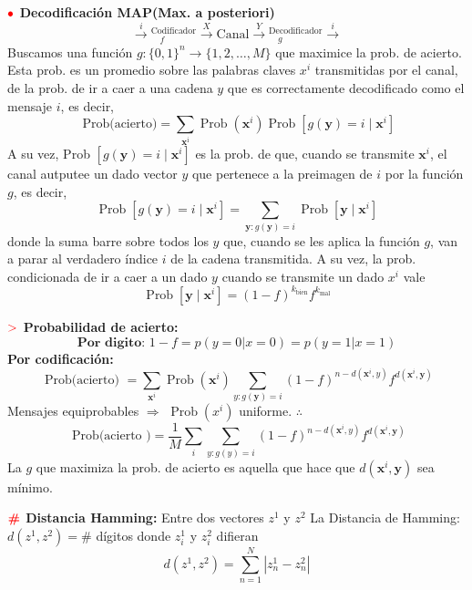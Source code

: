 \documentclass[%
 reprint,
 amsmath,amssymb,
 aps,
]{revtex4-1}
\begin{document}
\textbf{$\color{red}{\bullet}$ Decodificación MAP(Max. a posteriori)}
$$
\stackrel{i}{\rightarrow}
\boxed{^\text{Codificador}_{\quad f}} \stackrel{X}{\rightarrow}
\boxed{\text{Canal}} \stackrel{Y}{\rightarrow}
\boxed{^\text{Decodificador} _{\quad g}} \stackrel{i}{\rightarrow}$$
Buscamos una función $g:\{0,1\}^{n} \rightarrow\{1,2, \ldots, M\}$ que maximice la prob. de acierto. Esta prob. es un promedio sobre las palabras claves $x^{i}$ transmitidas por el canal, de la prob. de ir a caer a una cadena $y$ que es correctamente decodificado
como el mensaje $i$, es decir,
$$
\text { Prob(acierto})=\sum_{\boldsymbol{x}^{\mathrm{i}}} \operatorname{Prob}\left(\boldsymbol{x}^{i}\right) \operatorname{Prob}\left[g(\boldsymbol{y})=i \mid \boldsymbol{x}^{i}\right]
$$
A su vez, Prob $\left[g(\boldsymbol{y})=i \mid \boldsymbol{x}^{i}\right]$ es la prob. de que, cuando se transmite $\boldsymbol{x}^{i}$, el canal autputee un dado vector $y$ que pertenece a la preimagen de $i$ por la función $g$, es decir,
$$
\operatorname{Prob}\left[g(\boldsymbol{y})=i \mid \boldsymbol{x}^{i}\right]=\sum_{\boldsymbol{y} : g(\boldsymbol{y})=i} \operatorname{Prob}\left[\boldsymbol{y} \mid \boldsymbol{x}^{i}\right]
$$
donde la suma barre sobre todos los $y$ que, cuando se les aplica la función $g$, van a parar al verdadero índice $i$ de la cadena transmitida. A su vez, la prob. condicionada de ir a caer a un dado $y$ cuando se transmite un dado $x^{i}$ vale
$$
\operatorname{Prob}\left[\boldsymbol{y} \mid \boldsymbol{x}^{i}\right]=(1-f)^{k_{\text {bien}}} f^{k_{\operatorname{mal}}}
$$

\textbf{$\textcolor{red}{\mathbf{>}}$ Probabilidad de acierto:}
$$\textbf{Por digito: }1-f = p(y=0|x=0)=p(y=1|x=1)$$
\textbf{Por codificación:}
$$
\text { Prob(acierto) }=\sum_{\boldsymbol{x}^{i}} \operatorname{Prob}\left(\boldsymbol{x}^{i}\right) \sum_{y : g(\boldsymbol{y})=i}(1-f)^{n-d\left(\boldsymbol{x}^{i}, y\right)} f^{d\left(\boldsymbol{x}^{i}, \boldsymbol{y}\right)}
$$
Mensajes equiprobables $\Rightarrow$ $\operatorname{Prob}\left(x^{i}\right)$ uniforme. $\boldsymbol{\therefore}$
$$
\text { Prob(acierto })=\frac{1}{M} \sum_{i} \sum_{y : g(y)=i}(1-f)^{n-d\left(\boldsymbol{x}^{i}, y\right)} f^{d\left(\boldsymbol{x}^{i}, \boldsymbol{y}\right)}
$$
La $g$ que maximiza la prob. de acierto es aquella que hace que 
$d\left(\boldsymbol{x}^{i}, \boldsymbol{y}\right)$ sea mínimo.

\textbf{$\color{red}{\textbf{\#}}$ Distancia Hamming:} 
Entre dos vectores $z^{1}$ y $z^{2}$ 
La Distancia de Hamming: 
$d\left(z^{1}, z^{2}\right) = \#$ dígitos donde $z^{1}_i$ y $z^{2}_i$ difieran
$$
d(z^{1}, z^{2})=\sum_{n=1}^{N}\left|z^{1}_{n}-z^{2}_{n}\right|
$$
\end{document}
